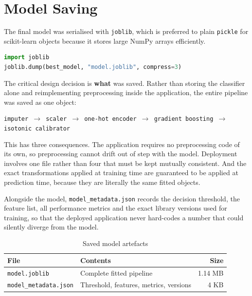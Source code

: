 \documentclass[11pt,a4paper]{report}
\begin{document}
\chapter{Model Saving}

The final model was serialised with \texttt{joblib}, which is preferred to plain
\texttt{pickle} for scikit-learn objects because it stores large NumPy arrays
efficiently.

\begin{lstlisting}[language=Python,caption={Saving the complete pipeline}]
import joblib
joblib.dump(best_model, "model.joblib", compress=3)
\end{lstlisting}

The critical design decision is \textbf{what} was saved. Rather than storing the
classifier alone and reimplementing preprocessing inside the application, the
entire pipeline was saved as one object:

\begin{center}
\texttt{imputer $\rightarrow$ scaler $\rightarrow$ one-hot encoder $\rightarrow$
gradient boosting $\rightarrow$ isotonic calibrator}
\end{center}

This has three consequences. The application requires no preprocessing code of
its own, so preprocessing cannot drift out of step with the model. Deployment
involves one file rather than four that must be kept mutually consistent. And
the exact transformations applied at training time are guaranteed to be applied
at prediction time, because they are literally the same fitted objects.

Alongside the model, \texttt{model\_metadata.json} records the decision
threshold, the feature list, all performance metrics and the exact library
versions used for training, so that the deployed application never hard-codes a
number that could silently diverge from the model.

\begin{table}[H]
\centering
\caption{Saved model artefacts}
\begin{tabular}{@{}llr@{}}
\toprule
\textbf{File} & \textbf{Contents} & \textbf{Size} \\
\midrule
\texttt{model.joblib} & Complete fitted pipeline & 1.14 MB \\
\texttt{model\_metadata.json} & Threshold, features, metrics, versions & 4 KB \\
\bottomrule
\end{tabular}
\end{table}
\end{document}
